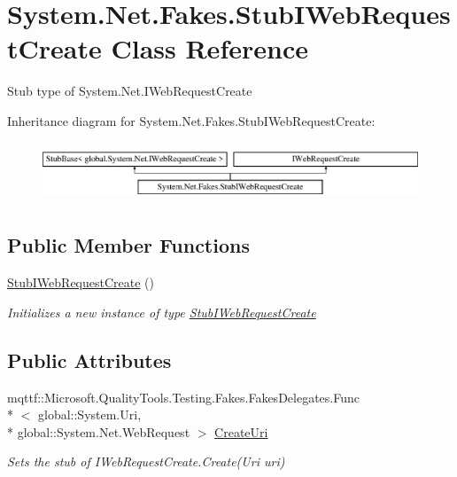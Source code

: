 \hypertarget{class_system_1_1_net_1_1_fakes_1_1_stub_i_web_request_create}{\section{System.\-Net.\-Fakes.\-Stub\-I\-Web\-Request\-Create Class Reference}
\label{class_system_1_1_net_1_1_fakes_1_1_stub_i_web_request_create}
}


Stub type of System.\-Net.\-I\-Web\-Request\-Create 


Inheritance diagram for System.\-Net.\-Fakes.\-Stub\-I\-Web\-Request\-Create\-:\begin{figure}[H]
\begin{center}
\leavevmode
\includegraphics[height=1.794872cm]{class_system_1_1_net_1_1_fakes_1_1_stub_i_web_request_create}
\end{center}
\end{figure}
\subsection*{Public Member Functions}
\begin{DoxyCompactItemize}
\item 
\hyperlink{class_system_1_1_net_1_1_fakes_1_1_stub_i_web_request_create_a6cc38bd0d114849e9dbe42d9e231cf20}{Stub\-I\-Web\-Request\-Create} ()
\begin{DoxyCompactList}\small\item\em Initializes a new instance of type \hyperlink{class_system_1_1_net_1_1_fakes_1_1_stub_i_web_request_create}{Stub\-I\-Web\-Request\-Create}\end{DoxyCompactList}\end{DoxyCompactItemize}
\subsection*{Public Attributes}
\begin{DoxyCompactItemize}
\item 
mqttf\-::\-Microsoft.\-Quality\-Tools.\-Testing.\-Fakes.\-Fakes\-Delegates.\-Func\\*
$<$ global\-::\-System.\-Uri, \\*
global\-::\-System.\-Net.\-Web\-Request $>$ \hyperlink{class_system_1_1_net_1_1_fakes_1_1_stub_i_web_request_create_abd9ea58a19ebb03af7e9ad68bc620907}{Create\-Uri}
\begin{DoxyCompactList}\small\item\em Sets the stub of I\-Web\-Request\-Create.\-Create(\-Uri uri)\end{DoxyCompactList}\end{DoxyCompactItemize}


